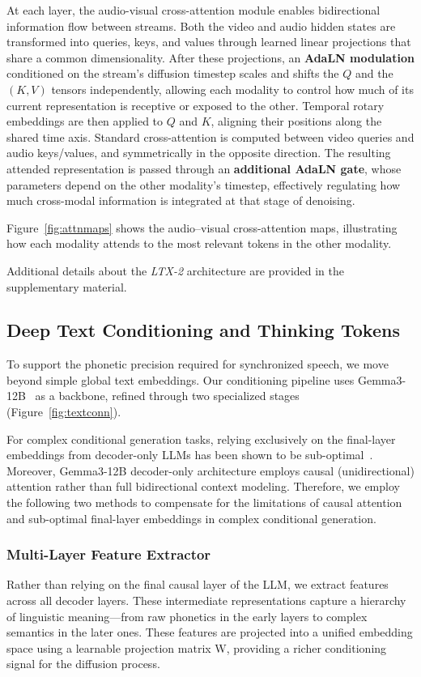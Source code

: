 \documentclass{article}
\begin{document}
At each layer, the audio-visual cross-attention module enables bidirectional information flow between streams.
Both the video and audio hidden states are transformed into queries, keys, and values through learned linear projections that share a common dimensionality.
After these projections, an \textbf{AdaLN modulation} conditioned on the stream’s diffusion timestep scales and shifts the $Q$ and the $(K,V)$ tensors independently, allowing each modality to control how much of its current representation is receptive or exposed to the other.
Temporal rotary embeddings are then applied to $Q$ and $K$, aligning their positions along the shared time axis.
Standard cross-attention is computed between video queries and audio keys/values, and symmetrically in the opposite direction.
The resulting attended representation is passed through an \textbf{additional AdaLN gate}, whose parameters depend on the other modality’s timestep, effectively regulating how much cross-modal information is integrated at that stage of denoising.

Figure~\ref{fig:attnmaps} shows the audio–visual cross-attention maps, illustrating how each modality attends to the most relevant tokens in the other modality.

Additional details about the \textit{LTX-2} architecture are provided in the supplementary material.

\subsection{Deep Text Conditioning and Thinking Tokens}

To support the phonetic precision required for synchronized speech, we move beyond simple global text embeddings. Our conditioning pipeline uses Gemma3-12B~\cite{team2025gemma} as a backbone, refined through two specialized stages (Figure~\ref{fig:textconn}).

For complex conditional generation tasks, relying exclusively on the final-layer embeddings from decoder-only LLMs has been shown to be sub-optimal~\cite{liu2024playground,wang2025comprehensive}. Moreover, Gemma3-12B decoder-only architecture employs causal (unidirectional) attention rather than full bidirectional context modeling. Therefore, we employ the following two methods to compensate for the limitations of causal attention and sub-optimal final-layer embeddings in complex conditional generation.

\subsubsection{Multi-Layer Feature Extractor} Rather than relying on the final causal layer of the LLM, we extract features across all decoder layers. These intermediate representations capture a hierarchy of linguistic meaning—from raw phonetics in the early layers to complex semantics in the later ones. These features are projected into a unified embedding space using a learnable projection matrix W, providing a richer conditioning signal for the diffusion process.
\end{document}
